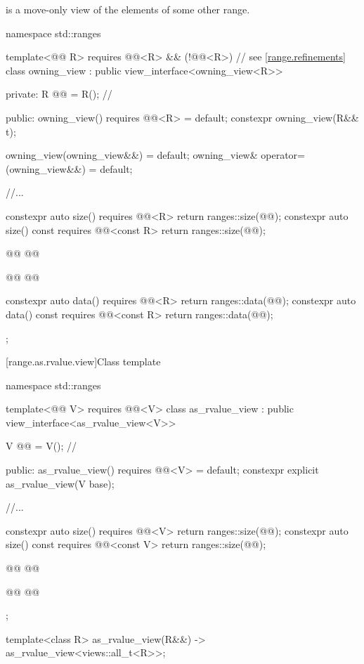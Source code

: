 \documentclass{wg21}
\begin{document}
\pnum
{} is a move-only view
of the elements of some other range.
\begin{codeblock}
namespace std::ranges {
template<@@ R>
requires @@<R> && (!@@<R>) // see \ref{range.refinements}
class owning_view : public view_interface<owning_view<R>> {
    private:
    R @@ = R();         // \expos

    public:
    owning_view() requires @@<R> = default;
    constexpr owning_view(R&& t);

    owning_view(owning_view&&) = default;
    owning_view& operator=(owning_view&&) = default;

    //...

    constexpr auto size() requires @@<R>
    { return ranges::size(@@); }
    constexpr auto size() const requires @@<const R>
    { return ranges::size(@@); }

    @@
    @@

    @@
    @@

    constexpr auto data() requires @@<R>
    { return ranges::data(@@); }
    constexpr auto data() const requires @@<const R>
    { return ranges::data(@@); }
};
}
\end{codeblock}

[range.as.rvalue.view]{Class template }

\begin{codeblock}
namespace std::ranges {
template<@@ V>
requires @@<V>
class as_rvalue_view : public view_interface<as_rvalue_view<V>> {
    V @@ = V();      // \expos

    public:
    as_rvalue_view() requires @@<V> = default;
    constexpr explicit as_rvalue_view(V base);

    //...

    constexpr auto size() requires @@<V> { return ranges::size(@@); }
    constexpr auto size() const requires @@<const V> { return ranges::size(@@); }

    @@
    @@

    @@
    @@
};

template<class R>
as_rvalue_view(R&&) -> as_rvalue_view<views::all_t<R>>;
}
\end{codeblock}
\end{document}

